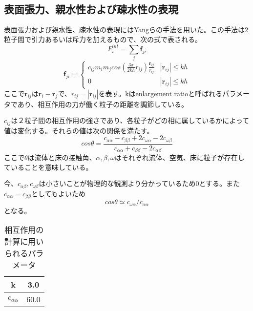 \documentclass[]{jsarticle}
\begin{document}
\subsection{表面張力、親水性および疎水性の表現}
表面張力および親水性、疎水性の表現にはYangらの手法を用いた。この手法は2粒子間で引力あるいは斥力を加えるもので、次の式で表される。
\begin{equation}
F^{int}_i=\sum_{j} \bm{f}_{ji}
\end{equation}
\begin{equation}
  \bm{f}_{ji}=\begin{cases}
    c_{ij}m_im_jcos(\frac{3\pi}{2kh}r_{ij})\frac{\bm{r}_{ij}}{r_{ij}} & \text{$|\bm{r}_{ij}|\leq kh$}\\
    0 & \text{$|\bm{r}_{ij}|\leq kh$}
\end{cases}
\end{equation}
ここで$\bm{r}_{ij}$は$\bm{r}_i-\bm{r}_{j}$で、$r_{ij}=|\bm{r}_{ij}|$を表す。kはenlargement ratioと呼ばれるパラメータであり、相互作用の力が働く粒子の距離を調節している。

$c_{ij}$は２粒子間の相互作用の強さであり、各粒子がどの相に属しているかによって値は変化する。それらの値は次の関係を満たす。
\begin{equation}
cos\theta=\frac{c_{\alpha\alpha}-c_{\beta\beta}+2c_{\omega\alpha}-2c_{\omega\beta}}{c_{\alpha\alpha} +c_{\beta\beta} -2c_{\alpha\beta}}
\end{equation}
ここで$\theta$は流体と床の接触角、$\alpha,\beta,\omega$はそれぞれ流体、空気、床に粒子が存在していることを意味している。

今、$c_{\alpha\beta},c_{\omega\beta}$は小さいことが物理的な観測より分かっているため0とする。また$c_{\alpha\alpha}=c_{\beta\beta}$としてもよいため
\begin{equation}
cos\theta\simeq c_{\omega\alpha}/c_{\alpha\alpha}
\end{equation}
となる。
\begin{table}[h]
  \caption{相互作用の計算に用いられるパラメータ}
  \label{interParam}
  \begin{center}
    \begin{tabular}{|c|c|}\hline
      k&3.0 \\ \hline
      $c_{\alpha\alpha}$ & 60.0 \\ \hline
    \end{tabular}
  \end{center}  
\end{table}
\end{document}
